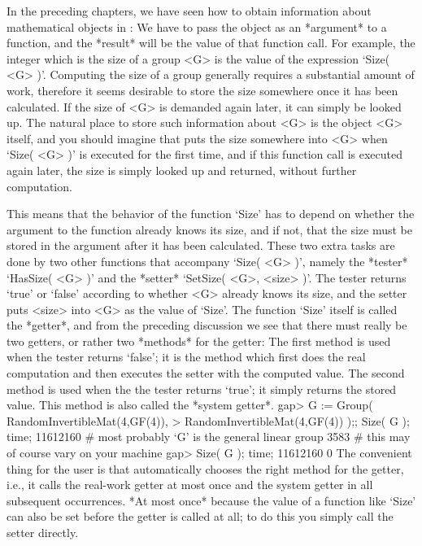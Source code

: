 

In the preceding chapters,  we have seen  how to obtain information about
mathematical  objects   in {\GAP}: We   have  to pass  the   object as an
*argument* to  a function, and the   *result* will be  the value  of that
function call. For example, the integer which is  the size of a group <G>
is  the value of the  expression `Size( <G> )'.   Computing the size of a
group generally requires a substantial amount of work, therefore it seems
desirable to store the size somewhere once it has been calculated. If the
size  of <G> is demanded   again later, it can  simply  be looked up. The
natural place  to  store such information  about  <G>  is the object  <G>
itself, and  you should imagine that  {\GAP} puts the size somewhere into
<G> when `Size( <G>   )' is executed  for the  first  time, and   if this
function call is executed  again later, the size is  simply looked up and
returned, without further computation.

This means  that  the behavior of the   function `Size' has  to depend on
whether the argument to the function already knows  its size, and if not,
that the  size   must be  stored  in  the  argument   after it  has  been
calculated. These two extra  tasks are done by  two other  functions that
accompany  `Size( <G> )',  namely the *tester*  `HasSize( <G>  )' and the
*setter*  `SetSize( <G>, <size> )'. The  tester returns `true' or `false'
according to  whether <G>  already knows its  size, and  the  setter puts
<size>  into <G> as the  value of `Size'. The   function `Size' itself is
called the *getter*, and from the preceding discussion  we see that there
must really be two  getters, or rather two *methods*  for the getter: The
first  method is used when  the tester returns  `false'; it is the method
which first does  the real computation and then  executes the setter with
the computed value. The second method is used when the the tester returns
`true'; it simply  returns the stored value.  This method is also  called
the *system getter*.
\beginexample
    gap> G := Group( RandomInvertibleMat(4,GF(4)),
    >                RandomInvertibleMat(4,GF(4)) );; Size( G ); time;
    11612160  # most probably `G' is the general linear group
    3583      # this may of course vary on your machine
    gap> Size( G ); time;
    11612160
    0
\endexample
The convenient thing  for the user  is that  {\GAP} automatically chooses
the right method for the  getter, i.e., it  calls the real-work getter at
most once and  the system getter in  all subsequent occurrences. *At most
once* because the value of a function like  `Size' can also be set before
the getter  is called  at  all; to do  this  you simply call  the  setter
directly.

